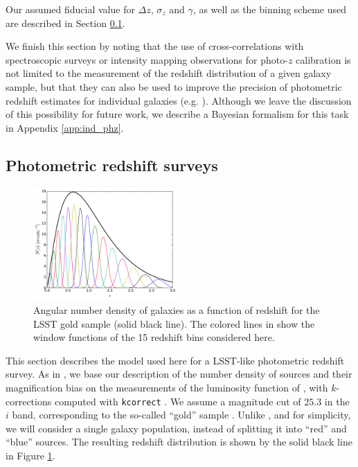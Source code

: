 \documentclass[prd,twocolumn]{revtex4}
\begin{document}
    Our assumed fiducial value for $\Delta z$, $\sigma_z$ and $\gamma$, as well as the binning scheme
    used are described in Section \ref{ssec:method.phz}.

    We finish this section by noting that the use of cross-correlations with spectroscopic surveys or
    intensity mapping observations for photo-$z$ calibration is not limited to the measurement of
    the redshift distribution of a given galaxy sample, but that they can also be used to improve the
    precision of photometric redshift estimates for individual galaxies (e.g. \cite{2012MNRAS.425.1042J}). 
    Although we leave the discussion of this possibility for future work, we describe a Bayesian
    formalism for this task in Appendix \ref{app:ind_phz}.
    
  \subsection{Photometric redshift surveys}\label{ssec:method.phz}
    \begin{figure}
      \centering
      \includegraphics[width=0.49\textwidth]{nz_lsst}
      \caption{Angular number density of galaxies as a function of redshift for the LSST
                gold sample (solid black line). The colored lines in show the window functions
                of the 15 redshift bins considered here.}
      \label{fig:nz_lsst}
    \end{figure}
    This section describes the model used here for a LSST-like photometric redshift survey.
    As in \cite{2015PhRvD..92f3525A}, we base our description of the number density of sources
    and their magnification bias on the measurements of the luminosity function of
    \cite{2006A&A...448..101G}, with $k$-corrections computed with {\tt kcorrect}
    \cite{2007AJ....133..734B}. We assume a magnitude cut of $25.3$ in the $i$ band, corresponding
    to the so-called ``gold'' sample \cite{2009arXiv0912.0201L}. Unlike \cite{2015PhRvD..92f3525A},
    and for simplicity, we will consider a single galaxy population,
    instead of splitting it into ``red'' and ``blue'' sources. The resulting redshift
    distribution is shown by the solid black line in Figure \ref{fig:nz_lsst}.
\end{document}
